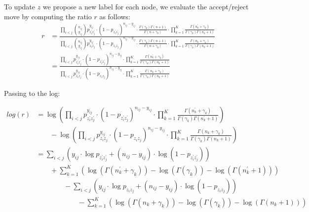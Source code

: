 \documentclass[11pt]{amsart}
\begin{document}
To update $z$ we propose a new label for each node, we evaluate the accept/reject move by computing the ratio $r$ as follows:
\begin{align}
r &= \frac{\prod_{i<j}\binom{n_{ij}}{y_{ij}}p_{z^{\prime}_i z^{\prime}_j}^{y_{ij}} \cdot (1 - p_{z^{\prime}_i z^{\prime}_j})^{n_{ij} - y_{ij}} \cdot \frac{\Gamma(\gamma_0) \Gamma(n+1)}{\Gamma(n + \gamma_0)} \cdot \prod_{k=1}^K \frac{\Gamma(n^{\prime}_k + \gamma_k)}{\Gamma(\gamma_k)  \Gamma(n^{\prime}_k + 1)}}{\prod_{i<j}\binom{n_{ij}}{y_{ij}}p_{z_iz_j}^{y_{ij}} \cdot (1 - p_{z_iz_j})^{n_{ij} - y_{ij}}\cdot \frac{\Gamma(\gamma_0) \Gamma(n+1)}{\Gamma(n + \gamma_0)} \cdot \prod_{k=1}^K \frac{\Gamma(n_k + \gamma_k)}{\Gamma(\gamma_k)  \Gamma(n_k + 1)}} \\
 &= \frac{\prod_{i<j}p_{z^{\prime}_i z^{\prime}_j}^{y_{ij}} \cdot (1 - p_{z^{\prime}_i z^{\prime}_j})^{n_{ij} - y_{ij}} \cdot  \prod_{k=1}^K \frac{\Gamma(n^{\prime}_k + \gamma_k)}{\Gamma(\gamma_k)  \Gamma(n^{\prime}_k + 1)}}{\prod_{i<j}p_{z_iz_j}^{y_{ij}} \cdot (1 - p_{z_iz_j})^{n_{ij} - y_{ij}} \cdot \prod_{k=1}^K \frac{\Gamma(n_k + \gamma_k)}{\Gamma(\gamma_k)  \Gamma(n_k + 1)}} 
\end{align}


Passing to the log:

\begin{align}
log(r) &= \log{ \left( \prod_{i<j}p_{z^{\prime}_i z^{\prime}_j}^{y_{ij}} \cdot (1 - p_{z^{\prime}_i z^{\prime}_j})^{n_{ij} - y_{ij}} \cdot  \prod_{k=1}^K \frac{\Gamma(n^{\prime}_k + \gamma_k)}{\Gamma(\gamma_k)  \Gamma(n^{\prime}_k + 1)} \right) }  \nonumber \\
& \qquad - \log{ \left( \prod_{i<j}p_{z_iz_j}^{y_{ij}} \cdot (1 - p_{z_iz_j})^{n_{ij} - y_{ij}} \cdot \prod_{k=1}^K \frac{\Gamma(n_k + \gamma_k)}{\Gamma(\gamma_k)  \Gamma(n_k + 1)}\right)} \nonumber \\
&= \sum_{i<j} \left(   y_{ij} \cdot \log{ p_{z^{\prime}_i z^{\prime}_j} } + (n_{ij} - y_{ij}) \cdot \log{ (1 - p_{z^{\prime}_i z^{\prime}_j}) } \right)\nonumber \\ 
&\qquad +  \sum_{k=1}^K\left(\log\left(\Gamma(n^{\prime}_{k}+\gamma_{k})\right) - \log\left(\Gamma(\gamma_{k})\right) - \log\left(\Gamma\left(n^{\prime}_{k}+1\right)\right) \right)  \nonumber  \\
& \qquad \qquad - \sum_{i<j} \left(  y_{ij} \cdot \log{ p_{z_i z_j} } + (n_{ij} - y_{ij}) \cdot \log{ (1 - p_{z_i z_j}) } \right) \nonumber \\
&\qquad \qquad \qquad - \sum_{k=1}^K\left(\log\left(\Gamma(n_{k}+\gamma_{k})\right) - \log\left(\Gamma(\gamma_{k})\right) - \log\left(\Gamma\left(n_{k}+1\right)\right) \right) \nonumber \\
\end{align}
\end{document}
